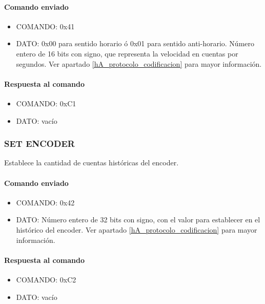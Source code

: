 \paragraph*{Comando enviado}

\begin{itemize}
	\item{COMANDO:} 0x41
	\item{DATO:} 0x00 para sentido horario \'o 0x01 para sentido anti-horario.
		N\'umero entero de 16 bits con signo, que representa la velocidad en cuentas por segundos.
		Ver apartado \ref{hA_protocolo_codificacion} para mayor informaci\'on.
\end{itemize}

\paragraph*{Respuesta al comando}

\begin{itemize}
	\item{COMANDO:} 0xC1
	\item{DATO:} vac\'io
\end{itemize}

\subsubsection{SET ENCODER}
\label{hA_protocolo_set_encoder}

Establece la cantidad de cuentas hist\'oricas del encoder.

\paragraph*{Comando enviado}

\begin{itemize}
	\item{COMANDO:} 0x42
	\item{DATO:} N\'umero entero de 32 bits con signo, con el valor para establecer en el hist\'orico del encoder.
		Ver apartado \ref{hA_protocolo_codificacion} para mayor informaci\'on.
\end{itemize}

\paragraph*{Respuesta al comando}

\begin{itemize}
	\item{COMANDO:} 0xC2
	\item{DATO:} vac\'io
\end{itemize}

